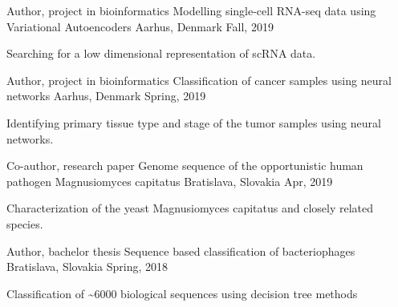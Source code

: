 
\begin{cventries}

  \cventry
    {Author, project in bioinformatics} %
    {Modelling single-cell RNA-seq data using Variational Autoencoders} %
    {Aarhus, Denmark} %
    {Fall, 2019} %
    {
      \begin{cvitems} %
        \item {Searching for a low dimensional representation of scRNA data.}
      \end{cvitems}
    }

  \cventry
    {Author, project in bioinformatics} %
    {Classification of cancer samples using neural networks} %
    {Aarhus, Denmark} %
    {Spring, 2019} %
    {
      \begin{cvitems} %
        \item {Identifying primary tissue type and stage of the tumor samples using neural networks.}
      \end{cvitems}
    }

  \cventry
    {Co-author, research paper} %
    {Genome sequence of the opportunistic human pathogen Magnusiomyces capitatus} %
    {Bratislava, Slovakia} %
    {Apr, 2019} %
    {
      \begin{cvitems} %
        \item {Characterization of the yeast Magnusiomyces capitatus and closely related species.}
      \end{cvitems}
    }

  \cventry
    {Author, bachelor thesis} %
    {Sequence based classification of bacteriophages} %
    {Bratislava, Slovakia} %
    {Spring, 2018} %
    {
      \begin{cvitems} %
        \item {Classification of \textasciitilde 6000 biological sequences using decision tree methods}
      \end{cvitems}
    }


\end{cventries}
